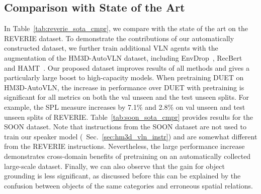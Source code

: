 \subsection{Comparison with State of the Art}
In Table~\ref{tab:reverie_sota_cmpr}, we compare with the state of the art on the REVERIE dataset.
To demonstrate the contributions of our automatically constructed dataset, we further train additional VLN agents with the augmentation of the HM3D-AutoVLN dataset, including EnvDrop~\cite{tan2019learning}, RecBert~\cite{hong2020recurrent} and HAMT~\cite{chen2021hamt}.
Our proposed dataset improves results of all methods and gives a particularly large boost to high-capacity models.
When pretraining DUET on HM3D-AutoVLN, the increase in performance over DUET with pretraining is significant for all metrics on both the val unseen and the test unseen splits. For example, the SPL measure increases by 7.1\% and 2.8\% on val unseen and test unseen splits of REVERIE.
Table~\ref{tab:soon_sota_cmpr} provides results for the SOON dataset.
Note that instructions from the SOON dataset are not used to train our speaker model (\cf~Sec.~\ref{sec:hm3d_vln_instr}) and are somewhat different from the REVERIE instructions.
Nevertheless, the large performance increase demonstrates cross-domain benefits of pretraining on an automatically collected large-scale dataset. Finally, we can also observe that the gain for object grounding is less significant, as discussed before this can be explained by the confusion between objects of the same categories and erroneous spatial relations. 




